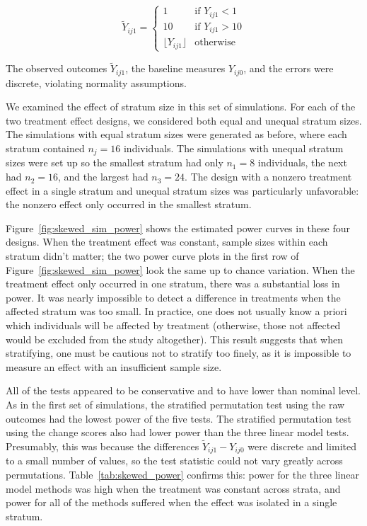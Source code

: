 \documentclass[12pt]{article}
\begin{document}
\begin{displaymath}
   \tilde{Y}_{ij1} = \left\{
     \begin{array}{ll}
       1 & \text{if } {Y}_{ij1} < 1\\
       10 & \text{if } {Y}_{ij1} > 10 \\
       \lfloor {Y}_{ij1} \rfloor & \text{otherwise}
     \end{array}
   \right.
\end{displaymath}


The observed outcomes $\tilde{Y}_{ij1}$, the baseline measures $Y_{ij0}$, and the errors were discrete, violating normality assumptions.

We examined the effect of stratum size in this set of simulations.
For each of the two treatment effect designs, we considered both equal and unequal stratum sizes.
The simulations with equal stratum sizes were generated as before, where each stratum contained $n_j = 16$ individuals.
The simulations with unequal stratum sizes were set up so the smallest stratum had only $n_1=8$ individuals, the next had $n_2= 16$, and the largest had $n_3=24$.
The design with a nonzero treatment effect in a single stratum and unequal stratum sizes was particularly unfavorable:
the nonzero effect only occurred in the smallest stratum.

Figure~\ref{fig:skewed_sim_power} shows the estimated power curves in these four designs.
When the treatment effect was constant, sample sizes within each stratum didn't matter; 
the two power curve plots in the first row of Figure~\ref{fig:skewed_sim_power} look the same up to chance variation.
When the treatment effect only occurred in one stratum, there was a substantial loss in power.
It was nearly impossible to detect a difference in treatments when the affected stratum was too small.
In practice, one does not usually know a priori which individuals will be affected by treatment (otherwise, those not affected would be excluded from the study altogether).
This result suggests that when stratifying, one must be cautious not to stratify too finely, as it is impossible to measure an effect with an insufficient sample size.

All of the tests appeared to be conservative and to have lower than nominal level.
As in the first set of simulations, the stratified permutation test using the raw outcomes had the lowest power of the five tests.
The stratified permutation test using the change scores also had lower power than the three linear model tests.
Presumably, this was because the differences $\tilde{Y}_{ij1} - Y_{ij0}$ were discrete and limited to a small number of values, so the test statistic could not vary greatly across permutations.
Table~\ref{tab:skewed_power} confirms this: power for the three linear model methods was high when the treatment was constant across strata, and power for all of the methods suffered when the effect was isolated in a single stratum.
\end{document}
